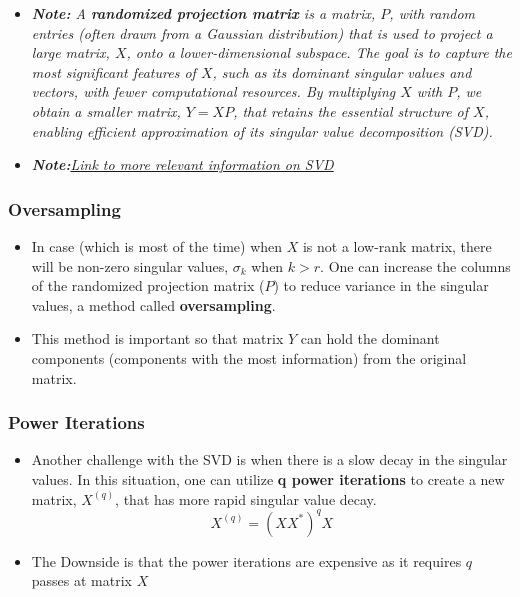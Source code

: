 \documentclass[11.5pt,a4paper]{article}
\begin{document}
\begin{itemize}
    \item \textit{\textbf{Note:} A \textbf{randomized projection matrix} is a matrix, \( P \), with random entries (often drawn from a Gaussian distribution) that is used to project a large matrix, \( X \), onto a lower-dimensional subspace. The goal is to capture the most significant features of \( X \), such as its dominant singular values and vectors, with fewer computational resources. By multiplying \( X \) with \( P \), we obtain a smaller matrix, \( Y = XP \), that retains the essential structure of \( X \), enabling efficient approximation of its singular value decomposition (SVD).}    
    
    \item \textit{\textbf{Note:}\href{https://tropp.caltech.edu/slides/Tro21-RandSVD-slides.pdf}{Link to more relevant information on SVD}}
\end{itemize}

\subsubsection*{Oversampling}

\begin{itemize}
    \item In case (which is most of the time) when $X$ is not a low-rank matrix, there will be non-zero singular values, $\sigma_k$ when $k > r$. One can increase the columns of the randomized projection matrix ($P$) to reduce variance in the singular values, a method called \textbf{oversampling}. 
    \item This method is important so that matrix $Y$ can hold the dominant components (components with the most information) from the original matrix.
\end{itemize}

\subsubsection*{Power Iterations}

\begin{itemize}
    \item Another challenge with the SVD is when there is a slow decay in the singular values. In this situation, one can utilize \textbf{q power iterations} to create a new matrix, $X^{(q)}$, that has more rapid singular value decay.
    \begin{equation*}
        X^{(q)} = (XX^*)^qX
    \end{equation*}
    \item The Downside is that the power iterations are expensive as it requires $q$ passes at matrix $X$
\end{itemize}
\end{document}
